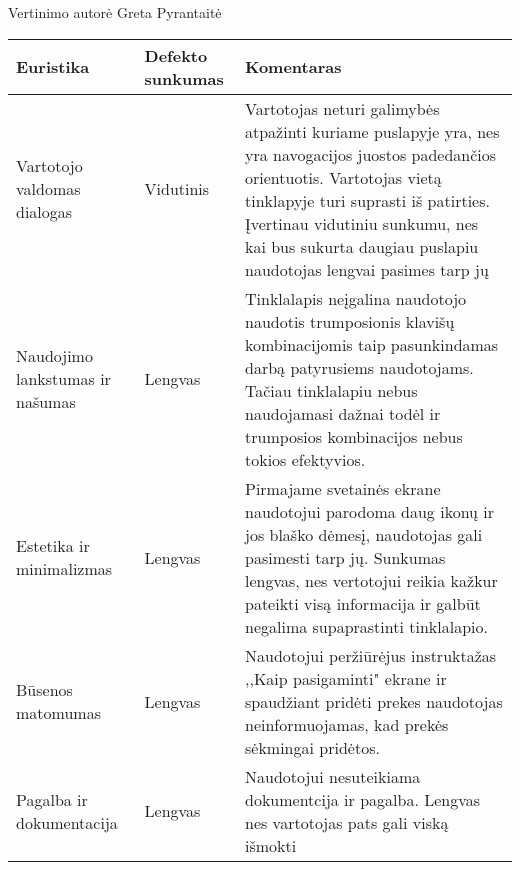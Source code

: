 \documentclass[oneside]{VUMIFPSkursinis}
\begin{document}
Vertinimo autorė Greta Pyrantaitė
\begin{center}
    \begin{tabular}{ |p{3cm}| p{3cm} | p{11cm} | }
    \hline
	Euristika &Defekto sunkumas & Komentaras \\ \hline
	Vartotojo valdomas dialogas & Vidutinis & Vartotojas neturi galimybės atpažinti kuriame puslapyje yra, nes yra navogacijos juostos padedančios orientuotis. Vartotojas vietą tinklapyje turi suprasti iš patirties. Įvertinau vidutiniu sunkumu, nes kai bus sukurta daugiau puslapiu naudotojas lengvai pasimes tarp jų \\ \hline
	Naudojimo lankstumas ir našumas & Lengvas & Tinklalapis neįgalina naudotojo naudotis trumposionis klavišų kombinacijomis taip pasunkindamas darbą patyrusiems naudotojams. Tačiau tinklalapiu nebus naudojamasi dažnai todėl ir trumposios kombinacijos nebus tokios efektyvios. \\ \hline
	Estetika ir minimalizmas & Lengvas & Pirmajame svetainės ekrane naudotojui parodoma daug ikonų ir jos blaško dėmesį, naudotojas gali pasimesti tarp jų. Sunkumas lengvas, nes vertotojui reikia kažkur pateikti visą informacija ir galbūt negalima supaprastinti tinklalapio. \\ \hline
	Būsenos matomumas & Lengvas & Naudotojui peržiūrėjus instruktažas ,,Kaip pasigaminti" ekrane ir spaudžiant pridėti prekes naudotojas neinformuojamas, kad prekės sėkmingai pridėtos. \\ \hline
	Pagalba ir dokumentacija & Lengvas & Naudotojui nesuteikiama dokumentcija ir pagalba. Lengvas nes vartotojas pats gali viską išmokti \\ \hline	 
   \hline
    \end{tabular}
\end{center}

\pagebreak
\end{document}
